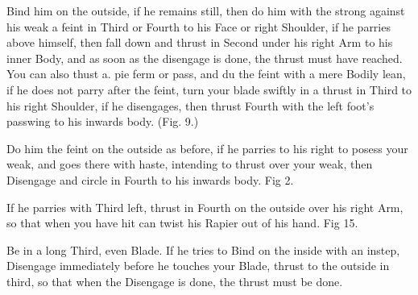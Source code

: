 \exercise{}
Bind him on the outside, if he remains still, then do him with the
strong against his weak a feint in Third or Fourth to his Face or
right Shoulder, if he parries above himself, then fall down and thrust
in Second under his right Arm to his inner Body, and as soon as the
disengage is done, the thrust must have reached. You can also thust
a. pie ferm or pass, and du the feint with a mere Bodily lean, if he
does not parry after the feint, turn your blade swiftly in a thrust in
Third to his right Shoulder, if he disengages, then thrust Fourth with
the left foot's passwing to his inwards body. (Fig. 9.)

\exercise{}
Do him the feint on the outside as before, if he parries to his right
to posess your weak, and goes there with haste, intending to thrust
over your weak, then Disengage and circle in Fourth to his inwards
body. Fig 2.

\exercise{}
If he parries with Third left, thrust in Fourth on the outside over his right Arm, so that when you have hit can twist his Rapier out of his hand. Fig 15.

\exercise{}
Be in a long Third, even Blade. If he tries to Bind on the inside
with an instep, Disengage immediately before he touches your
Blade, thrust to the outside in third, so that when the Disengage
is done, the thrust must be done.

